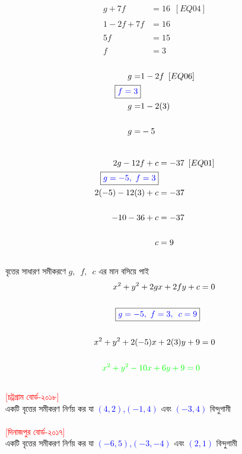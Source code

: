 \documentclass{article}
\begin{document}
\\
\begin{align*}
g+7f&=16\,\,\,[EQ04]\\
\\
1-2f+7f&=16\\
\\
5f&=15\\
\\
f&=3
\end{align*}
\\
\begin{align*}
g=&1-2f\,\,\,[EQ06]\\
	\boxed{\textcolor{blue}{f=3}}&\\
g=&1-2(3)\\
\\
g=&-5
\end{align*}
\\
\begin{align*}
	2g-12f+c&=-37\,\,\,[EQ01]\\
	\boxed{\textcolor{blue}{g=-5,\,\,f=3}}&\\
2(-5)-12(3)+c&=-37\\
\\
-10-36+c&=-37\\
\\
c&=9
\end{align*}
\\
বৃত্তের সাধারণ সমীকরণে $g,\,\,\,f,\,\,\,c$  এর মান বসিয়ে পাই \\ 
\begin{align*}
	x^2+y^2+2gx+2fy+c&=0\\
	\\
		\boxed{\textcolor{blue}{g=-5,\,\,f=3,\,\,\,c=9}}&\\
		\\
		x^2+y^2+2(-5)x+2(3)y+9&=0\\
		\\
	\textcolor{green}{x^2+y^2-10x+6y+9=0}&	\\	
\end{align*}
\\
\textcolor{red}{[চট্রগ্রাম বোর্ড-২০১৮]}\\ 
	একটি বৃত্তের সমীকরণ নির্ণয় কর যা \textcolor{blue}{$(4,2)$,$(-1,4)$} এবং \textcolor{blue}{$(-3,4)$}  বিন্দুগামী \\ 
	\\
	\textcolor{red}{[দিনাজপুর বোর্ড-২০১৭]}\\ 
	একটি বৃত্তের সমীকরণ নির্ণয় কর যা \textcolor{blue}{$(-6,5)$,$(-3,-4)$} এবং \textcolor{blue}{$(2,1)$}  বিন্দুগামী \\ 
\end{document}
